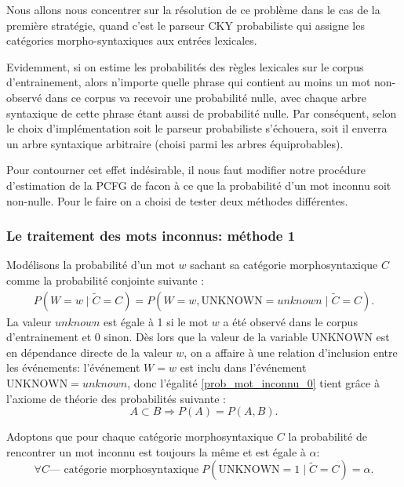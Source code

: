 \documentclass[12pt]{article}
\begin{document}
Nous allons nous concentrer sur la r\'esolution de ce probl\`eme dans le cas de la
premi\`ere strat\'egie, quand c'est le parseur CKY probabiliste qui assigne les
cat\'egories morpho-syntaxiques aux entr\'ees lexicales. \par

Evidemment, si on estime
les probabilit\'es des r\`egles lexicales sur le corpus d'entrainement, alors
n'importe quelle phrase qui contient au moins un mot non-observ\'e dans ce corpus
va recevoir une probabilit\'e nulle, avec chaque arbre syntaxique de cette phrase
\'etant aussi de probabilit\'e nulle. Par cons\'equent, selon le choix
d'impl\'ementation soit le parseur probabiliste s'\'echouera, soit il enverra un
arbre syntaxique arbitraire (choisi parmi les arbres \'equiprobables). \par

Pour contourner cet effet ind\'esirable, il nous faut modifier notre proc\'edure
d'estimation de la PCFG de facon \`a ce que la probabilit\'e d'un mot inconnu
soit non-nulle. Pour le faire on a choisi de tester deux m\'ethodes diff\'erentes.

\subsubsection{Le traitement des mots inconnus: m\'ethode 1}

Mod\'elisons la probabilit\'e d'un mot $w$ sachant sa cat\'egorie morphosyntaxique
$C$ comme la probabilit\'e conjointe suivante :
\begin{eqnarray}
\label{prob_mot_inconnu_0}
 P(W = w \mid \tilde{C} = C) = P(W = w, \mathrm{UNKNOWN} = unknown \mid \tilde{C} = C).
\end{eqnarray}
La valeur $unknown$ est \'egale \`a 1 si le mot $w$ a \'et\'e observ\'e dans le
corpus d'entrainement et 0 sinon. D\`es lors que la valeur de la variable
$\mathrm{UNKNOWN}$ est en d\'ependance directe de la valeur $w$, on a affaire \`a
une relation d'inclusion entre les \'ev\'enements: l'\'ev\'enement $W = w$ est
inclu dans l'\'ev\'enement $\mathrm{UNKNOWN} = unknown$, donc l'\'egalit\'e
\ref{prob_mot_inconnu_0} tient gr\^ace \`a l'axiome de th\'eorie des probabilit\'es
suivante :
$$ A \subset B \Rightarrow P(A) = P(A,B).$$

Adoptons que pour chaque cat\'egorie morphosyntaxique $C$ la probabilit\'e de
rencontrer un mot inconnu est toujours la m\^eme et est \'egale \`a $\alpha$:
$$ \forall C \text{--- cat\'egorie morphosyntaxique} \; P(\mathrm{UNKNOWN} = 1 \mid \tilde{C} = C) = \alpha.$$
\end{document}
